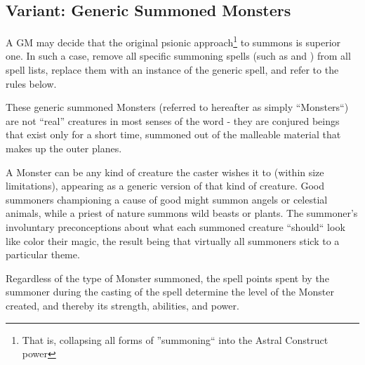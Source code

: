 % 
% 
% 
\newpage
\subsection{Variant: Generic Summoned Monsters}
\label{sec:SummonedMonsters}
A GM may decide that the original psionic approach\footnote{That is, collapsing all forms of ''summoning`` into the Astral Construct power} to summons is superior one. In such a case, remove all specific summoning spells (such as  and ) from all spell lists, replace them with an instance of the generic  spell, and refer to the rules below.

These generic summoned Monsters (referred to hereafter as simply ``Monsters``) are not ``real'' creatures
in most senses of the word - they are conjured beings that exist only for a short time, summoned out
of the malleable material that makes up the outer planes.

A Monster can be any kind of creature the caster wishes it to (within size limitations), 
appearing as a generic version of that kind of creature.
Good summoners championing a cause of good might summon angels or celestial animals, while a priest of nature
summons wild beasts or plants.
The summoner's involuntary preconceptions about what each summoned creature ``should`` look like color their magic, 
the result being that virtually all summoners stick to a particular theme.

Regardless of the type of Monster summoned, the spell points spent by the summoner during the casting
of the spell determine the level of the Monster created, and thereby its strength, abilities, and power.
